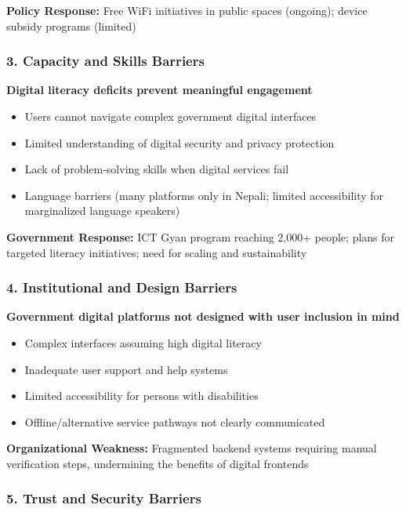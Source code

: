 \documentclass[12pt,a4paper]{article}
\begin{document}
\textbf{Policy Response:} Free WiFi initiatives in public spaces (ongoing); device subsidy programs (limited)

\subsubsection{3. Capacity and Skills Barriers}

\textbf{Digital literacy deficits prevent meaningful engagement}
\begin{itemize}
    \item Users cannot navigate complex government digital interfaces
    \item Limited understanding of digital security and privacy protection
    \item Lack of problem-solving skills when digital services fail
    \item Language barriers (many platforms only in Nepali; limited accessibility for marginalized language speakers)
\end{itemize}

\textbf{Government Response:} ICT Gyan program reaching 2,000+ people; plans for targeted literacy initiatives; need for scaling and sustainability

\subsubsection{4. Institutional and Design Barriers}

\textbf{Government digital platforms not designed with user inclusion in mind}
\begin{itemize}
    \item Complex interfaces assuming high digital literacy
    \item Inadequate user support and help systems
    \item Limited accessibility for persons with disabilities
    \item Offline/alternative service pathways not clearly communicated
\end{itemize}

\textbf{Organizational Weakness:} Fragmented backend systems requiring manual verification steps, undermining the benefits of digital frontends

\subsubsection{5. Trust and Security Barriers}
\end{document}
